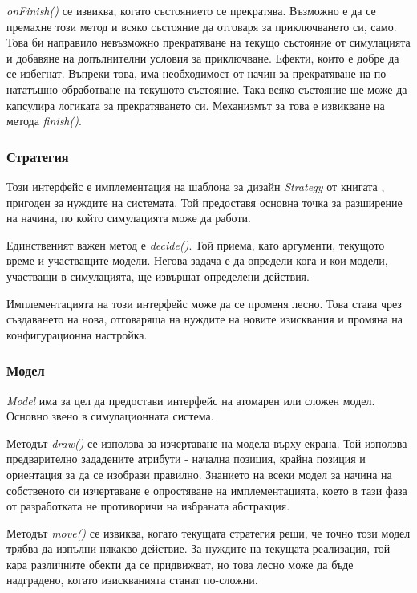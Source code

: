 			\emph{onFinish()} се извиква, когато състоянието се прекратява. Възможно е да се премахне този метод и 
			всяко състояние да отговаря за приключването си, само. Това би направило невъзможно
			прекратяване на текущо състояние от симулацията и добавяне на допълнителни условия за приключване. 
			Ефекти, които е добре да се избегнат. Въпреки това, има необходимост от начин за прекратяване на по-нататъшно обработване
			на текущото състояние. Така всяко състояние ще може да капсулира логиката за прекратяването си. Механизмът
			за това е извикване на метода \emph{finish()}.
		
		\subsubsection{Стратегия}
		
			Този интерфейс е имплементация на шаблона за дизайн \emph{Strategy} от книгата \cite{Gamma}, 
			пригоден за нуждите на системата. Той предоставя основна точка за разширение на начина,
			по който симулацията може да работи.
			
			Единственият важен метод е \emph{decide()}. Той приема, като аргументи, текущото време и участващите модели.
			Негова задача е да определи кога и кои модели, участващи в симулацията, ще извършат определени действия.
			
			Имплементацията на този интерфейс може да се променя лесно. Това става чрез създаването на нова, отговаряща
			на нуждите на новите изисквания и промяна на конфигурационна настройка.

		\subsubsection{Модел}		
		
			\emph{Model} има за цел да предостави интерфейс на атомарен или сложен модел. Основно
			звено в симулационната система.		
			
			Методът \emph{draw()} се използва за изчертаване на модела върху екрана. Той използва
			предварително зададените атрибути - начална позиция, крайна позиция и ориентация за
			да се изобрази правилно. Знанието на всеки модел за начина на собственото си изчертаване
			е опростяване на имплементацията, което в тази фаза от разработката не противоричи
			на избраната абстракция.
			
			Методът \emph{move()} се извиква, когато текущата стратегия реши, че точно този модел
			трябва да изпълни някакво действие. За нуждите на текущата реализация, той кара
			различните обекти да се придвижват, но това лесно може да бъде надградено,
			когато изискванията станат по-сложни.
		
